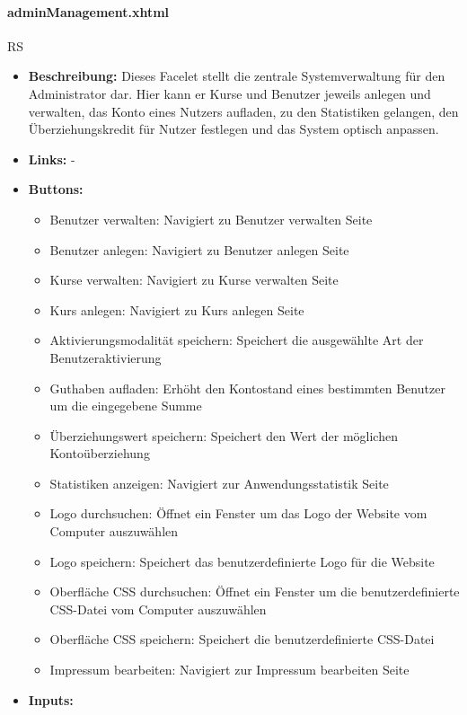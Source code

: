 				\paragraph{adminManagement.xhtml}
					RS\\
					\begin{itemize}
						\item \textbf{Beschreibung:} Dieses Facelet stellt die zentrale Systemverwaltung für den Administrator dar. Hier kann er Kurse und Benutzer jeweils anlegen und verwalten, das Konto eines Nutzers aufladen, zu den Statistiken gelangen, den Überziehungskredit für Nutzer festlegen und das System optisch anpassen.
						\item \textbf{Links:} -
						\item \textbf{Buttons:}
							\begin{itemize}
								\item Benutzer verwalten: Navigiert zu Benutzer verwalten Seite
								\item Benutzer anlegen: Navigiert zu Benutzer anlegen Seite
								\item Kurse verwalten: Navigiert zu Kurse verwalten Seite
								\item Kurs anlegen: Navigiert zu Kurs anlegen Seite
								\item Aktivierungsmodalität speichern: Speichert die ausgewählte Art der Benutzeraktivierung
								\item Guthaben aufladen: Erhöht den Kontostand eines bestimmten Benutzer um die eingegebene Summe 
								\item Überziehungswert speichern: Speichert den Wert der möglichen Kontoüberziehung
								\item Statistiken anzeigen: Navigiert zur Anwendungsstatistik Seite
								\item Logo durchsuchen: Öffnet ein Fenster um das Logo der Website vom Computer auszuwählen
								\item Logo speichern: Speichert das benutzerdefinierte Logo für die Website
								\item Oberfläche CSS durchsuchen: Öffnet ein Fenster um die benutzerdefinierte CSS-Datei vom Computer auszuwählen
								\item Oberfläche CSS speichern: Speichert die benutzerdefinierte CSS-Datei
								\item Impressum bearbeiten: Navigiert zur Impressum bearbeiten Seite
							\end{itemize}
						\item \textbf{Inputs:}

\end{itemize}
